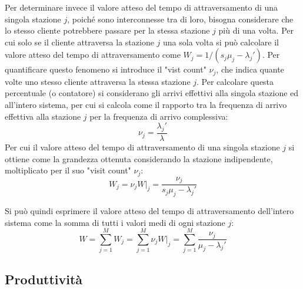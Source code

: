 \documentclass{article}
\numberwithin{equation}{subsection}
\begin{document}
Per determinare invece il valore atteso del tempo di attraversamento di una singola stazione $j$, poiché sono interconnesse tra di loro, bisogna considerare che lo stesso 
cliente potrebbere passare per la stessa stazione $j$ più di una volta. Per cui solo se il cliente attraversa la stazione $j$ una sola volta si può calcolare 
il valore atteso del tempo di attraversamento come $W_j=1/(s_j\mu_j-\lambda_j')$. Per quantificare questo fenomeno si introduce il "vist count" $\nu_j$, che indica quante volte 
uno stesso cliente attraversa la stessa stazione $j$. Per calcolare questa percentuale (o contatore) si considerano gli arrivi effettivi alla singola stazione ed all'intero 
sistema, per cui si calcola come il rapporto tra la frequenza di arrivo effettiva alla stazione $j$ per la frequenza di arrivo complessiva:
\begin{equation}
    \nu_j=\displaystyle\frac{\lambda_j'}{\lambda}
\end{equation}
Per cui il valore atteso del tempo di attraversamento di una singola stazione $j$ si ottiene come la grandezza ottenuta considerando la stazione indipendente, moltiplicato 
per il suo "visit count" $\nu_j$:
\begin{equation}
    W_j=\nu_jW\big|_j=\displaystyle\frac{\nu_j}{s_j\mu_j-\lambda_j'}
\end{equation}

Si può quindi esprimere il valore atteso del tempo di attraversamento dell'intero sistema come la somma di tutti i valori medi di ogni stazione $j$:
\begin{equation}
    W=\displaystyle\sum_{j=1}^MW_j=\sum_{j=1}^M\nu_jW\big|_j=\sum_{j=1}^M\frac{\nu_j}{\mu_j-\lambda_j'}
\end{equation}

\subsection{Produttività}
\end{document}
